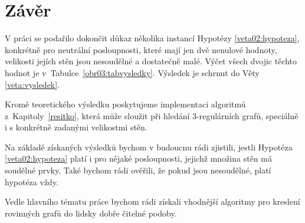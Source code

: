 \chapter*{Závěr}
V práci se podařilo dokončit důkaz několika instancí Hypotézy \ref{veta02:hypoteza}, konkrétně pro neutrální posloupnosti, které mají jen dvě nenulové hodnoty, velikosti jejích stěn jsou nesoudělné a dostatečně malé. Výčet všech dvojic těchto hodnot je v~Tabulce~\ref{obr03:tabvysledky}. Výsledek je schrnut do Věty \ref{veta:vysledek}.

Kromě teoretického výsledku poskytujeme implementaci algoritmů z~Kapitoly~\ref{resitko}, která může sloužit při hledání 3-regulárních grafů, speciálně i s konkrétně zadanými velikostmi stěn.

Na základě získaných výsledků bychom v budoucnu rádi zjistili, jestli Hypotéza \ref{veta02:hypoteza} platí i pro nějaké posloupnosti, jejichž množina stěn má soudělné prvky. Také bychom rádi ověřili, že pokud jsou nesoudělné, platí hypotéza vždy.

Vedle hlavního tématu práce bychom rádi získali vhodnější algoritmy pro kreslení rovinných grafů do lidsky dobře čitelné podoby.